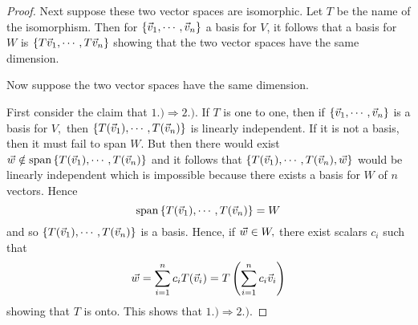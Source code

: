 \begin{proof}
Next suppose these two vector spaces are isomorphic. Let $T$ be the name of
the isomorphism. Then for $\left\{ \vec{v}_{1},\cdots ,\vec{v}_{n}\right\} $
a basis for $V$, it follows that a basis for $W$
is $\left\{ T\vec{v}_{1},\cdots ,T\vec{v}_{n}\right\} $ showing that the two
vector spaces have the same dimension.

Now suppose the two vector spaces have the same dimension.

First consider the claim that $1.)\Rightarrow 2.).$ If $T$ is one to one,
then if $\left\{ \vec{v}_{1},\cdots ,\vec{v}
_{n}\right\} $ is a basis for $V,$ then $\left\{ T(\vec{v}_{1}),\cdots ,T(\vec{v
}_{n})\right\} $ is linearly independent. If it is not a basis, then it must
fail to span $W$. But then there would exist $\vec{w}\notin \mbox{span}
\left\{ T(\vec{v}_{1}),\cdots ,T(\vec{v}_{n})\right\} $ and it follows that $
\left\{ T(\vec{v}_{1}),\cdots ,T(\vec{v}_{n}),\vec{w}\right\} $ would be
linearly independent which is impossible because there exists a basis for $W$
of $n$ vectors. Hence 
\[
\mbox{span}\left\{ T(\vec{v}_{1}),\cdots ,T(\vec{v}
_{n})\right\} =W
\]
and so $\left\{ T(\vec{v}_{1}),\cdots ,T(\vec{v}_{n})\right\} $
is a basis. Hence, if $\vec{w}\in W,$ there exist scalars $c_{i}$ such that 
\begin{equation*}
\vec{w}=\sum_{i=1}^{n}c_{i}T(\vec{v}_{i})=T\left( \sum_{i=1}^{n}c_{i}\vec{v}
_{i}\right)
\end{equation*}
showing that $T$ is onto. This shows that $1.)\Rightarrow 2.).$


\end{proof}
